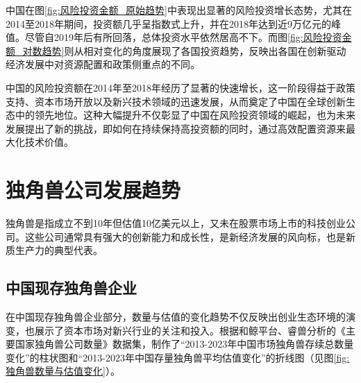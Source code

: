 中国在图\ref{fig:风险投资金额_原始趋势}中表现出显著的风险投资增长态势，尤其在2014至2018年期间，投资额几乎呈指数式上升，并在2018年达到近9万亿元的峰值\cite{Chen2022}。尽管自2019年后有所回落，总体投资水平依然居高不下。而图\ref{fig:风险投资金额_对数趋势}则从相对变化的角度展现了各国投资趋势，反映出各国在创新驱动经济发展中对资源配置和政策侧重点的不同。

中国的风险投资额在2014年至2018年经历了显著的快速增长，这一阶段得益于政策支持、资本市场开放以及新兴技术领域的迅速发展，从而奠定了中国在全球创新生态中的领先地位。这种大幅提升不仅彰显了中国在风险投资领域的崛起，也为未来发展提出了新的挑战，即如何在持续保持高投资额的同时，通过高效配置资源来最大化技术价值。

\section{独角兽公司发展趋势}
独角兽是指成立不到10年但估值10亿美元以上，又未在股票市场上市的科技创业公司。这些公司通常具有强大的创新能力和成长性，是新经济发展的风向标，也是新质生产力的典型代表。

\subsection{中国现存独角兽企业}
在中国现存独角兽企业部分，数量与估值的变化趋势不仅反映出创业生态环境的演变，也展示了资本市场对新兴行业的关注和投入。根据和鲸平台、睿兽分析的《主要国家独角兽公司数量》数据集，制作了“2013-2023年中国市场独角兽存续总数量变化”的柱状图和“2013-2023年中国存量独角兽平均估值变化”的折线图（见图\ref{fig:独角兽数量与估值变化}）。

